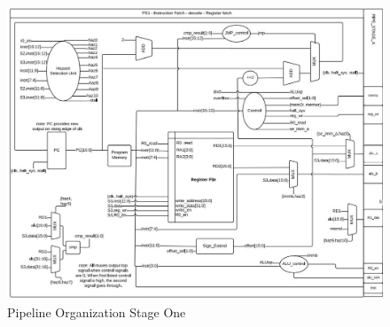     
    \begin{figure}[htpb]
        \includegraphics[width=\textwidth]{./figures/stage1.jpg}
        \caption{Pipeline Organization Stage One}
        \label{stage1}
    \end{figure}

